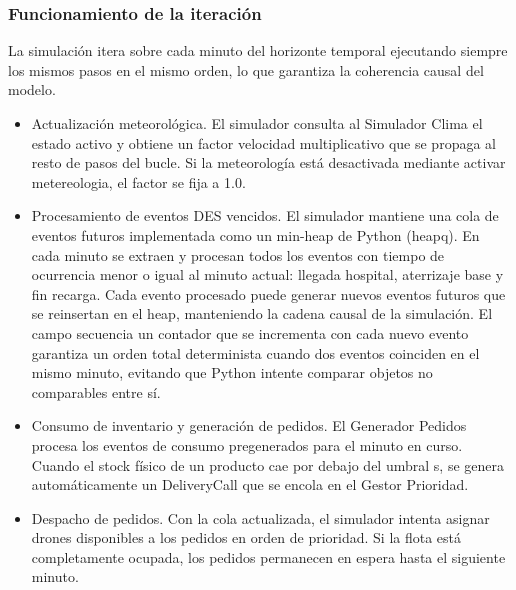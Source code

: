 \documentclass[11pt, a4paper]{article} %
\begin{document}
\subsubsection{Funcionamiento de la iteración}
La simulación itera sobre cada minuto del horizonte temporal ejecutando siempre los mismos pasos en el mismo orden, lo que garantiza la coherencia causal del modelo.

\begin{itemize}
    \item Actualización meteorológica. El simulador consulta al Simulador Clima el estado activo y obtiene un factor velocidad multiplicativo que se propaga al resto de pasos del bucle. Si la meteorología está desactivada mediante activar metereologia, el factor se fija a 1.0.
    \item Procesamiento de eventos DES vencidos. El simulador mantiene una cola de eventos futuros implementada como un min-heap de Python (heapq). En cada minuto se extraen y procesan todos los eventos con tiempo de ocurrencia menor o igual al minuto actual: llegada hospital, aterrizaje base y fin recarga. Cada evento procesado puede generar nuevos eventos futuros que se reinsertan en el heap, manteniendo la cadena causal de la simulación. El campo secuencia un contador que se incrementa con cada nuevo evento garantiza un orden total determinista cuando dos eventos coinciden en el mismo minuto, evitando que Python intente comparar objetos no comparables entre sí.
    \item Consumo de inventario y generación de pedidos. El Generador Pedidos procesa los eventos de consumo pregenerados para el minuto en curso. Cuando el stock físico de un producto cae por debajo del umbral s, se genera automáticamente un DeliveryCall que se encola en el Gestor Prioridad.
    \item Despacho de pedidos. Con la cola actualizada, el simulador intenta asignar drones disponibles a los pedidos en orden de prioridad. Si la flota está completamente ocupada, los pedidos permanecen en espera hasta el siguiente minuto.
\end{itemize}
\end{document}
